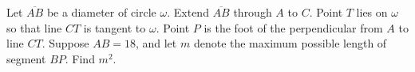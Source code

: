 Let $ \overline{AB}$ be a diameter of circle $ \omega$. Extend $ \overline{AB}$ through $ A$ to $ C$. Point $ T$ lies on $ \omega$ so that line $ CT$ is tangent to $ \omega$. Point $ P$ is the foot of the perpendicular from $ A$ to line $ CT$. Suppose $ AB = 18$, and let $ m$ denote the maximum possible length of segment $ BP$. Find $ m^{2}$.